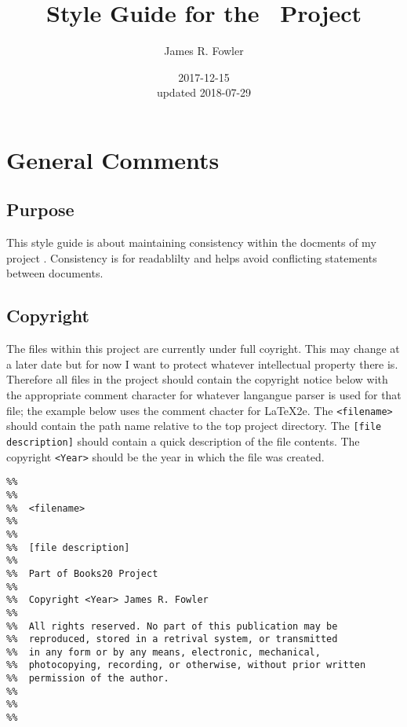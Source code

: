 \documentclass[twoside]{book}
\begin{document}
\frontmatter

\title{Style Guide for the \ProjectTitle\ Project}
\author{James R. Fowler}
\date{2017-12-15\\ updated 2018-07-29}

\maketitle

\tableofcontents

\mainmatter

\chapter{General Comments}

\section{Purpose}
This style guide is about maintaining consistency within the docments
of my project \ProjectTitle. Consistency is for readablilty and
helps avoid conflicting statements between documents. 

\section{Copyright}

The files within this project are currently under full coyright.  This
may change at a later date but for now I want to protect whatever
intellectual property there is.  Therefore all files in the project
should contain the copyright notice below with the appropriate comment
character for whatever langangue parser is used for that file; the
example below uses the comment chacter for \LaTeX2e.  The
\texttt{<filename>} should contain the path name relative to the top
project directory. The \texttt{[file description]} should contain a
quick description of the file contents. The copyright \texttt{<Year>}
should be the year in which the file was created.

\begin{verbatim}
%%
%%
%%  <filename>
%%
%%  
%%  [file description]
%%
%%  Part of Books20 Project
%%
%%  Copyright <Year> James R. Fowler
%%
%%  All rights reserved. No part of this publication may be
%%  reproduced, stored in a retrival system, or transmitted
%%  in any form or by any means, electronic, mechanical,
%%  photocopying, recording, or otherwise, without prior written
%%  permission of the author.
%%
%%
%%
\end{verbatim}
\end{document}
